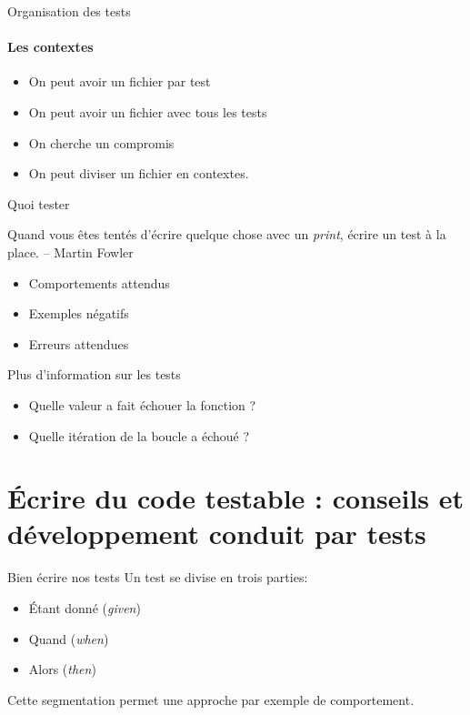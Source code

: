 \documentclass[11pt]{beamer}
\begin{document}
\begin{frame}{Organisation des tests}
\framesubtitle{Les contextes}
\begin{itemize}
\item On peut avoir un fichier par test
\item On peut avoir un fichier avec tous les tests
\item On cherche un compromis
\item On peut diviser un fichier en contextes.
\end{itemize}
\end{frame}

\begin{frame}{Quoi tester}
\begin{block}{}
Quand vous êtes tentés d'écrire quelque chose avec un \textit{print}, écrire un test à la place. -- Martin Fowler
\end{block}
\begin{itemize}
\item Comportements attendus
\item Exemples négatifs
\item Erreurs attendues
\end{itemize}
\end{frame}

\begin{frame}{Plus d'information sur les tests}
\begin{itemize}
\item Quelle valeur a fait échouer la fonction ?
\item Quelle itération de la boucle a échoué ?
\end{itemize}
\end{frame}

\section[\'Ecrire du code testable : conseils et d\'eveloppement conduit par tests]{\'Ecrire du code testable : conseils et d\'eveloppement conduit par tests}

\begin{frame}{Bien écrire nos tests}
Un test se divise en trois parties:
\begin{itemize}
	\item Étant donné (\textit{given})
	\item Quand (\textit{when})
	\item Alors (\textit{then})
\end{itemize}
Cette segmentation permet une approche par exemple de comportement.

\end{frame}
\end{document}

